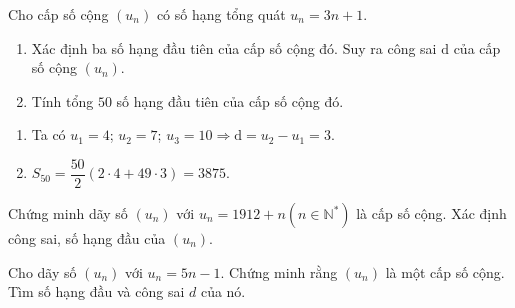 \begin{bt}%
    Cho cấp số cộng $\left(u_n\right)$ có số hạng tổng quát $u_n=3 n+1$.
    \begin{enumerate}
        \item Xác định ba số hạng đầu tiên của cấp số cộng đó. Suy ra công sai $\mathrm{d}$ của cấp số cộng $\left(u_n\right)$.
        \item Tính tổng $50$ số hạng đầu tiên của cấp số cộng đó.
    \end{enumerate}
    \loigiai
    {
        \begin{enumerate}
            \item Ta có $
            u_1=4$; $u_2=7$; $u_3=10 \Rightarrow \mathrm{d}=u_2-u_1=3
            $.
            \item $
            S_{50}=\dfrac{50}{2}(2\cdot 4+49\cdot 3)=3875
            $.
        \end{enumerate}
    }
\end{bt}

\begin{bt}%
Chứng minh dãy số $\left(u_n\right)$ với $u_n=1912+n\left(n \in \mathbb{N}^*\right)$ là cấp số cộng. Xác định công sai, số hạng đầu của $\left(u_n\right)$.

\end{bt}

\begin{bt}%

Cho dãy số $\left(u_n\right)$ với $u_n=5n-1$. Chứng minh rằng $\left(u_n\right)$ là một cấp số cộng. Tìm số hạng đầu và công sai $d$ của nó.
\end{bt}

